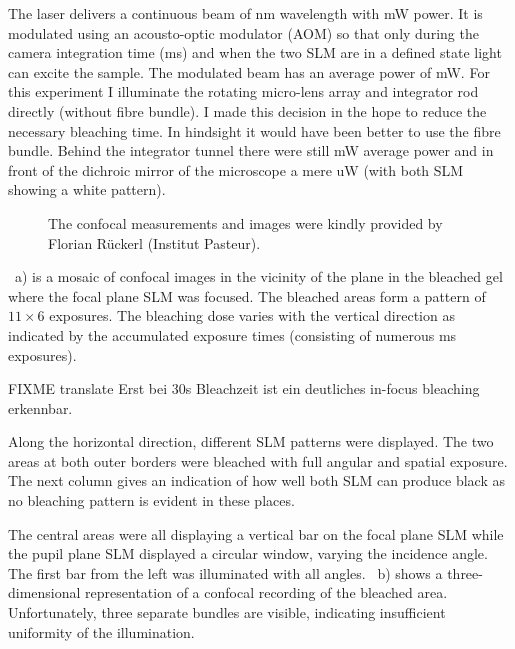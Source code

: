 
The  laser delivers a continuous beam of
\unit[473]{nm} wavelength with \unit[400]{mW} power. It is modulated
using an acousto-optic modulator (AOM) so that only during the camera
integration time (\unit[20]{ms}) and when the two SLM are in a defined
state light can excite the sample. The modulated beam has an average
power of \unit[15]{mW}. For this experiment I illuminate the rotating
micro-lens array and integrator rod directly (without fibre bundle). I
made this decision in the hope to reduce the necessary bleaching
time. In hindsight it would have been better to use the fibre
bundle. Behind the integrator tunnel there were still \unit[7]{mW}
average power and in front of the dichroic mirror of the microscope a
mere \unit[17]{uW} (with both SLM showing a white pattern).

\begin{figure}[htbp]
  \centering
  \caption{The confocal measurements and images were kindly provided
    by Florian R\"uckerl (Institut Pasteur).}
  \label{fig:overview-bleach}
\end{figure}

~a) is a mosaic of confocal images in the
vicinity of the plane in the bleached gel where the focal plane SLM
was focused. The bleached areas form a pattern of $11\times 6$
exposures. The bleaching dose varies with the vertical direction as
indicated by the accumulated exposure times (consisting of numerous
\unit[20]{ms} exposures). 

FIXME translate
Erst bei 30s Bleachzeit ist ein deutliches in-focus bleaching erkennbar. 


Along the horizontal direction, different SLM patterns were
displayed. The two areas at both outer borders were bleached with full
angular and spatial exposure. The next column gives an indication of
how well both SLM can produce black as no bleaching pattern is evident
in these places.

The  central areas were all
displaying a vertical bar on the focal plane SLM while the pupil plane
SLM displayed a circular window, varying the incidence angle. The
first bar from the left was illuminated with all
angles. ~b) shows a three-dimensional
representation of a confocal recording of the bleached
area. Unfortunately, three separate bundles are visible, indicating
insufficient uniformity of the illumination.

